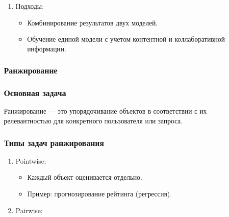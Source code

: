 \begin{enumerate}
\begin{enumerate}
  \begin{itemize}
  \tightlist
  \item
    Объединение коллаборативной и контентной фильтрации для повышения
    точности.
  \end{itemize}
\item
  Подходы:

  \begin{itemize}
  \tightlist
  \item
    Комбинирование результатов двух моделей.
  \item
    Обучение единой модели с учетом контентной и коллаборативной
    информации.
  \end{itemize}
\end{enumerate}

\hypertarget{ux440ux430ux43dux436ux438ux440ux43eux432ux430ux43dux438ux435}{%
\subsubsection*{Ранжирование}\label{ux440ux430ux43dux436ux438ux440ux43eux432ux430ux43dux438ux435}}

\hypertarget{ux43eux441ux43dux43eux432ux43dux430ux44f-ux437ux430ux434ux430ux447ux430}{%
\subsubsection*{Основная
задача}\label{ux43eux441ux43dux43eux432ux43dux430ux44f-ux437ux430ux434ux430ux447ux430}}

Ранжирование --- это упорядочивание объектов в соответствии с их
релевантностью для конкретного пользователя или запроса.

\hypertarget{ux442ux438ux43fux44b-ux437ux430ux434ux430ux447-ux440ux430ux43dux436ux438ux440ux43eux432ux430ux43dux438ux44f}{%
\subsubsection*{Типы задач
ранжирования}\label{ux442ux438ux43fux44b-ux437ux430ux434ux430ux447-ux440ux430ux43dux436ux438ux440ux43eux432ux430ux43dux438ux44f}}

\begin{enumerate}
\def\labelenumi{\arabic{enumi}.}
\tightlist
\item
  Pointwise:

  \begin{itemize}
  \tightlist
  \item
    Каждый объект оценивается отдельно.
  \item
    Пример: прогнозирование рейтинга (регрессия).
  \end{itemize}
\item
  Pairwise:


\end{enumerate}
\end{enumerate}
